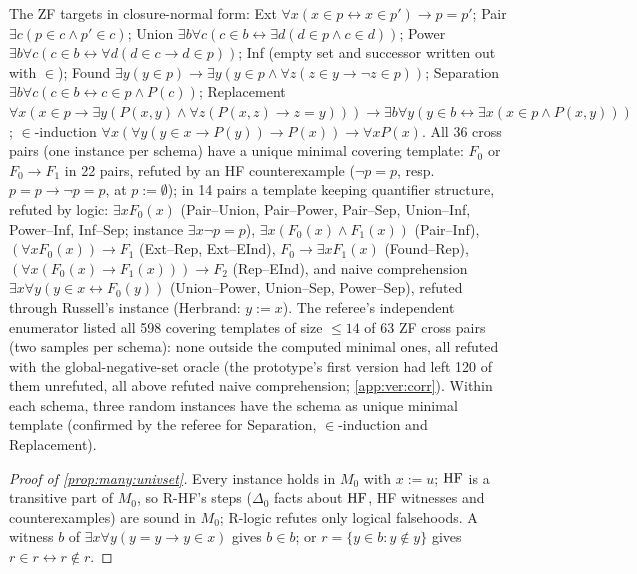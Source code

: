 \begin{example}\label{ex:many:zfcross}
The ZF targets in closure-normal form: Ext $\forall x(x\in p\leftrightarrow x\in p')\to p=p'$; Pair $\exists c(p\in c\wedge p'\in c)$; Union
$\exists b\forall c(c\in b\leftrightarrow\exists d(d\in p\wedge c\in d))$; Power $\exists b\forall c(c\in b\leftrightarrow\forall d(d\in c\to d\in p))$;
Inf (empty set and successor written out with $\in$); Found $\exists y(y\in p)\to\exists y(y\in p\wedge\forall z(z\in y\to\neg z\in p))$;
Separation $\exists b\forall c(c\in b\leftrightarrow c\in p\wedge P(c))$; Replacement $\forall x(x\in p\to\exists y(P(x,y)\wedge\forall
z(P(x,z)\to z=y)))\to\exists b\forall y(y\in b\leftrightarrow\exists x(x\in p\wedge P(x,y)))$; $\in$-induction $\forall x(\forall y(y\in x\to
P(y))\to P(x))\to\forall xP(x)$. All 36 cross pairs (one instance per schema) have a unique minimal covering template:
$F_0$ or $F_0\to F_1$ in 22 pairs, refuted by an HF counterexample ($\neg p=p$, resp.\ $p=p\to\neg p=p$, at $p:=\emptyset$);
in 14 pairs a template keeping quantifier structure, refuted by logic: $\exists xF_0(x)$ (Pair--Union, Pair--Power,
Pair--Sep, Union--Inf, Power--Inf, Inf--Sep; instance $\exists x\neg p=p$), $\exists x(F_0(x)\wedge F_1(x))$ (Pair--Inf),
$(\forall xF_0(x))\to F_1$ (Ext--Rep, Ext--EInd), $F_0\to\exists xF_1(x)$ (Found--Rep), $(\forall x(F_0(x)\to F_1(x)))\to F_2$
(Rep--EInd), and naive comprehension $\exists x\forall y(y\in x\leftrightarrow F_0(y))$ (Union--Power, Union--Sep, Power--Sep), refuted
through Russell's instance (Herbrand: $y:=x$). The referee's independent enumerator listed all 598 covering templates of
size $\le14$ of 63 ZF cross pairs (two samples per schema): none outside the computed minimal ones, all refuted with the
global-negative-set oracle (the prototype's first version had left 120 of them unrefuted, all above refuted naive
comprehension; \cref{app:ver:corr}). Within each schema, three random instances have the schema as unique minimal template (confirmed by the
referee for Separation, $\in$-induction and Replacement).
\end{example}

\begin{proof}[Proof of \cref{prop:many:univset}]
Every instance holds in $M_0$ with $x:=u$; $\mathrm{HF}$ is a transitive part of $M_0$, so R-HF's steps ($\Delta_0$ facts about
$\mathrm{HF}$, HF witnesses and counterexamples) are sound in $M_0$; R-logic refutes only logical falsehoods. A witness $b$ of
$\exists x\forall y(y=y\to y\in x)$ gives $b\in b$; or $r=\{y\in b:y\notin y\}$ gives $r\in r\leftrightarrow r\notin r$.
\end{proof}

